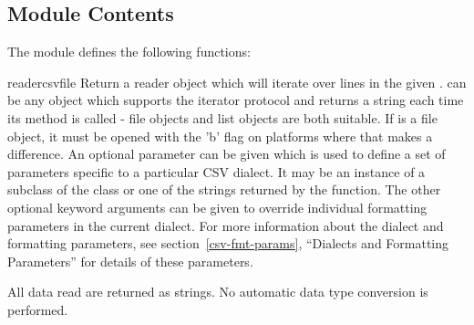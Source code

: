 \subsection{Module Contents \label{csv-contents}}

The  module defines the following functions:

\begin{funcdesc}{reader}{csvfile}
Return a reader object which will iterate over lines in the given
{}.   can be any object which supports the
iterator protocol and returns a string each time its 
method is called - file objects and list objects are both suitable.  
If  is a file object, it must be opened with
the 'b' flag on platforms where that makes a difference.  An optional
{} parameter can be given
which is used to define a set of parameters specific to a particular CSV
dialect.  It may be an instance of a subclass of the 
class or one of the strings returned by the 
function.  The other optional {} keyword arguments can be
given to override individual formatting parameters in the current
dialect.  For more information about the dialect and formatting
parameters, see section~\ref{csv-fmt-params}, ``Dialects and Formatting
Parameters'' for details of these parameters.

All data read are returned as strings.  No automatic data type
conversion is performed.


\end{funcdesc}

